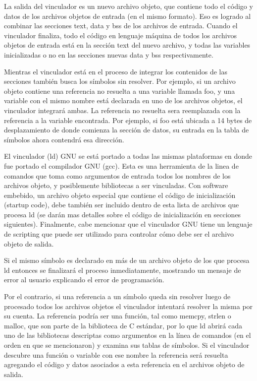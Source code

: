 \documentclass[12pt]{article}
\begin{document}
La salida del vinculador es un nuevo archivo objeto, que contiene todo el código y datos
de los archivos objetos de entrada (en el mismo formato).
Eso es logrado al combinar las secciones text, data y bss de los archivos de entrada.
Cuando el vinculador finaliza, todo el código en lenguaje máquina de todos los archivos
objetos de entrada está en la sección text del nuevo archivo, y todas las variables
inicializadas o no en las secciones nuevas data y bss respectivamente.

Mientras el vinculador está en el proceso de integrar 
los contenidos de las secciones también 
busca los símbolos sin resolver. Por ejemplo, si un archivo objeto contiene 
una referencia no resuelta a  una variable llamada foo, y una variable con 
el mismo nombre está declarada en uno de los archivos objetos, el vinculador
integrará ambas. La referencia no resuelta sera reemplazada con la referencia
a la variable encontrada. Por ejemplo, si foo está ubicada a 14 bytes de desplazamiento
de donde comienza la sección de datos, su entrada en la tabla de símbolos ahora
contendrá esa dirección.

El vinculador (ld) GNU se está portado a todas las mismas plataformas en donde
fue portado el compilador GNU (gcc). Esta es una herramienta de la linea de comandos
que toma como argumentos de entrada todos los nombres de los archivos objeto, 
y posiblemente bibliotecas a ser vinculadas.
Con software embebido, un archivo objeto especial que contiene el código de 
inicialización (startup code), debe también ser incluido dentro de esta
lista de archivos que procesa ld (se darán mas detalles sobre el código
de inicialización en secciones siguientes). Finalmente, cabe mencionar
que el vinculador GNU tiene un lenguaje de scripting que puede ser utilizado
para controlar cómo debe ser el archivo objeto de salida.

Si el mismo símbolo es declarado en más de un archivo objeto de los que 
procesa ld entonces se finalizará el proceso inmediatamente, mostrando un mensaje
de error al usuario explicando el error de programación.

Por el contrario, si una referencia a un símbolo queda sin resolver luego de
procesado todos los archivos objetos el vinculador intentará resolver la misma
por su cuenta.
La referencia podría ser una función, tal como memcpy, strlen o malloc, que son
parte de la biblioteca de C estándar, por lo que ld abrirá cada uno de las
bibliotecas descriptas como argumentos en la línea de comandos (en el orden
en que se mencionaron) y examina sus tablas de símbolos. 
Si el vinculador descubre una función o variable con ese nombre la referencia
será resuelta agregando el código y datos asociados a esta referencia en el 
archivos objeto de salida.
\end{document}
